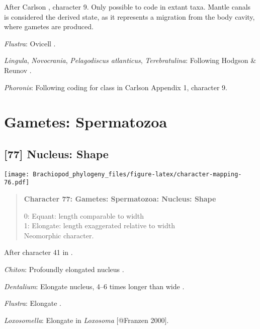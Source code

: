 \documentclass[openany]{book}
\theoremstyle{definition}
\theoremstyle{definition}
\theoremstyle{definition}
\theoremstyle{remark}
\begin{document}
After Carlson \citeyearpar{Carlson1995Phylogeneticrelationships},
character 9. Only possible to code in extant taxa. Mantle canals is
considered the derived state, as it represents a migration from the body
cavity, where gametes are produced.

\hypertarget{Flustra-coding-76}{}
\emph{Flustra}: Ovicell \citep{Franzen2013}.

\hypertarget{Lingula-coding-76}{}
\emph{Lingula}, \emph{Novocrania}, \emph{Pelagodiscus atlanticus},
\emph{Terebratulina}: Following Hodgson \& Reunov
\citeyearpar{Hodgson1994Ultrastructureof}.

\hypertarget{Phoronis-coding-76}{}
\emph{Phoronis}: Following coding for class in Carlson
\citeyearpar{Carlson1995Phylogeneticrelationships} Appendix 1, character
9.

\section{Gametes: Spermatozoa}\label{gametes-spermatozoa}

\subsection*{{[}77{]} Nucleus: Shape}\label{nucleus-shape}

\texttt{[image: Brachiopod\_phylogeny\_files/figure-latex/character-mapping-76.pdf]}

\begin{quote}
\textbf{Character 77: Gametes: Spermatozoa: Nucleus: Shape}

0: Equant: length comparable to width\\
1: Elongate: length exaggerated relative to width\\
Neomorphic character.
\end{quote}

After character 41 in \citet{Ponder1997}.

\hypertarget{Chiton-coding-77}{}
\emph{Chiton}: Profoundly elongated nucleus \citep{BucklandNicks1988}.

\hypertarget{Dentalium-coding-77}{}
\emph{Dentalium}: Elongate nucleus, 4--6 times longer than wide
\citep{DufresneDube1983}.

\hypertarget{Flustra-coding-77}{}
\emph{Flustra}: Elongate \citep{Franzen1981}.

\hypertarget{Loxosomella-coding-77}{}
\emph{Loxosomella}: Elongate in \emph{Loxosoma} {[}@Franzen 2000{]}.
\end{document}
